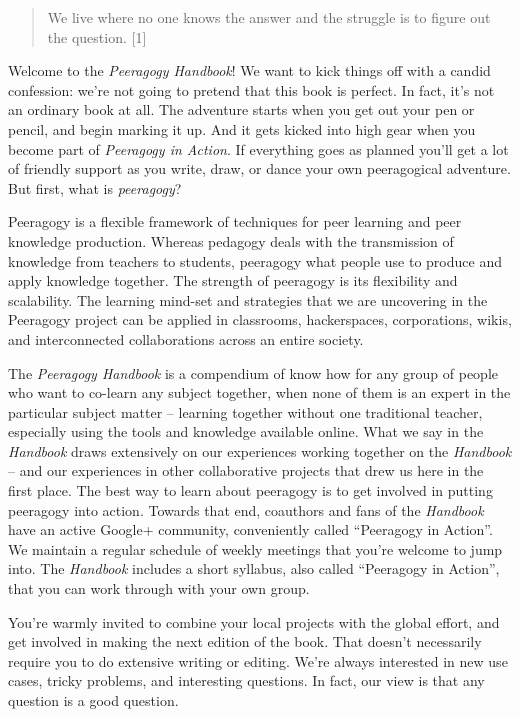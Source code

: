 \begin{quote}
We live where no one knows the answer and the struggle is to figure out
the question. {[}1{]}
\end{quote}

Welcome to the \emph{Peeragogy Handbook}! We want to kick things off
with a candid confession: we're not going to pretend that this book is
perfect. In fact, it's not an ordinary book at all. The adventure starts
when you get out your pen or pencil, and begin marking it up. And it
gets kicked into high gear when you become part of
\emph{Peeragogy in Action}.
If everything goes as planned you'll get a lot of friendly support as
you write, draw, or dance your own peeragogical adventure. But first,
what is \emph{peeragogy}?

Peeragogy is a flexible framework of techniques for peer learning and
peer knowledge production. Whereas pedagogy deals with the transmission
of knowledge from teachers to students, peeragogy what people use to
produce and apply knowledge together. The strength of peeragogy is its
flexibility and scalability. The learning mind-set and strategies that
we are uncovering in the Peeragogy project can be applied in classrooms,
hackerspaces, corporations, wikis, and interconnected collaborations
across an entire society.

The \emph{Peeragogy Handbook} is a compendium of know how for any group
of people who want to co-learn any subject together, when none of them
is an expert in the particular subject matter -- learning together
without one traditional teacher, especially using the tools and
knowledge available online. What we say in the \emph{Handbook} draws
extensively on our experiences working together on the \emph{Handbook}
-- and our experiences in other collaborative projects that drew us here
in the first place. The best way to learn about peeragogy is to get
involved in putting peeragogy into action. Towards that end, coauthors
and fans of the \emph{Handbook} have an active Google+ community,
conveniently called ``Peeragogy in Action''. We maintain a regular
schedule of weekly meetings that you're welcome to jump into. The
\emph{Handbook} includes a short syllabus, also called ``Peeragogy in
Action'', that you can work through with your own group.

You're warmly invited to combine your local projects with the global
effort, and get involved in making the next edition of the book. That
doesn't necessarily require you to do extensive writing or editing.
We're always interested in new use cases, tricky problems, and
interesting questions. In fact, our view is that any question is a good
question.

